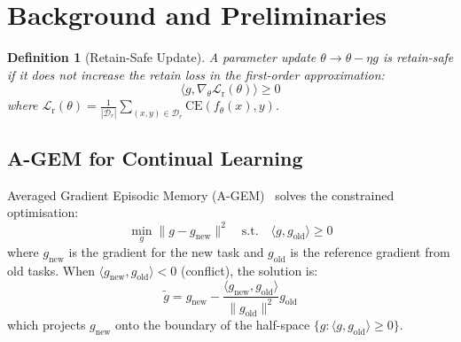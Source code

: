 \documentclass{article}
\newcommand{\CE}{\mathrm{CE}}
\newcommand{\Dr}{\mathcal{D}_r}
\newcommand{\lossr}{\mathcal{L}_{\mathrm{r}}}
\newtheorem{definition}{Definition}
\begin{document}
\section{Background and Preliminaries}\label{sec:background}

\begin{definition}[Retain-Safe Update]
\label{def:retain_safe}
A parameter update $\theta \to \theta - \eta g$ is \emph{retain-safe} if it does not increase the retain loss in the first-order approximation:
\begin{equation}
    \langle g, \nabla_\theta \lossr(\theta) \rangle \geq 0
\end{equation}
where $\lossr(\theta) = \frac{1}{|\Dr|} \sum_{(x,y) \in \Dr} \CE(f_\theta(x), y)$.
\end{definition}

\subsection{A-GEM for Continual Learning}

Averaged Gradient Episodic Memory (A-GEM)~\cite{chaudhry2019agem} solves the constrained optimisation:
\begin{equation}
    \min_{g} \|g - g_{\text{new}}\|^2 \quad \text{s.t.} \quad \langle g, g_{\text{old}} \rangle \geq 0
\end{equation}
where $g_{\text{new}}$ is the gradient for the new task and $g_{\text{old}}$ is the reference gradient from old tasks. When $\langle g_{\text{new}}, g_{\text{old}} \rangle < 0$ (conflict), the solution is:
\begin{equation}
    \tilde{g} = g_{\text{new}} - \frac{\langle g_{\text{new}}, g_{\text{old}} \rangle}{\|g_{\text{old}}\|^2} g_{\text{old}}
    \label{eq:agem_projection}
\end{equation}
which projects $g_{\text{new}}$ onto the boundary of the half-space $\{g : \langle g, g_{\text{old}} \rangle \geq 0\}$.

\end{document}
